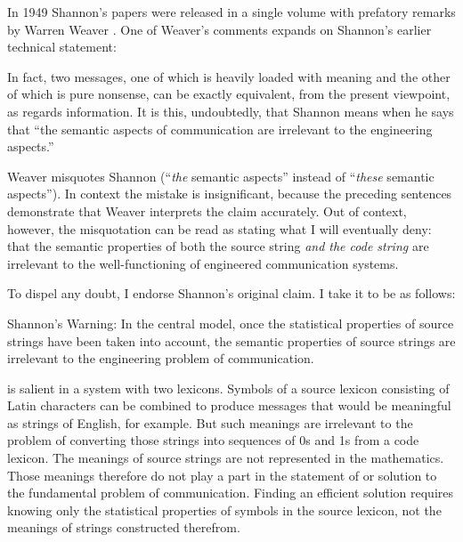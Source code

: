 In 1949 Shannon's papers were released in a single volume with prefatory remarks by Warren Weaver \citep{shannon1949mathematical}.
One of Weaver's comments expands on Shannon's earlier technical statement:

\begin{myquote}
In fact, two messages, one of which is heavily loaded with meaning and the other of which is pure nonsense, can be exactly equivalent, from the present viewpoint, as regards information. It is this, undoubtedly, that Shannon means when he says that ``the semantic aspects of communication are irrelevant to the engineering aspects.''
\par\hspace*{\fill}\citet[8]{shannon1949mathematical}
\end{myquote}

\noindent Weaver misquotes Shannon (``\emph{the} semantic aspects'' instead of ``\emph{these} semantic aspects'').
In context the mistake is insignificant, because the preceding sentences demonstrate that Weaver interprets the claim accurately.
Out of context, however, the misquotation can be read as stating what I will eventually deny: that the semantic properties of both the source string \textit{and the code string} are irrelevant to the well-functioning of engineered communication systems.

To dispel any doubt, I endorse Shannon's original claim.
I take it to be as follows:

\begin{myquote}
{\sc Shannon's Warning}: In the central model, once the statistical properties of source strings have been taken into account, the semantic properties of source strings are irrelevant to the engineering problem of communication.
\end{myquote}

 is salient in a system with two lexicons.
Symbols of a source lexicon consisting of Latin characters can be combined to produce messages that would be meaningful as strings of English, for example.
But such meanings are irrelevant to the problem of converting those strings into sequences of 0s and 1s from a code lexicon.
The meanings of source strings are not represented in the mathematics.
Those meanings therefore do not play a part in the statement of or solution to the fundamental problem of communication.
Finding an efficient solution requires knowing only the statistical properties of symbols in the source lexicon, not the meanings of strings constructed therefrom.

